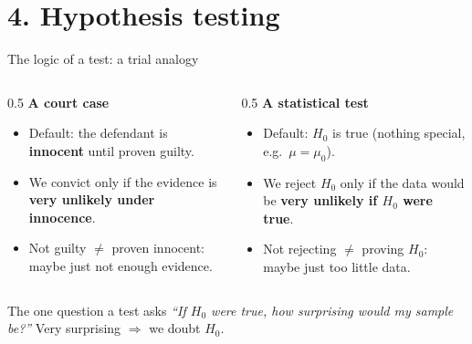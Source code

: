 \documentclass[
  11pt,
  ignorenonframetext,
  aspectratio=169,
]{beamer}
\providecommand{\tightlist}{%
  \setlength{\itemsep}{0pt}\setlength{\parskip}{0pt}}
\begin{document}
\section{4. Hypothesis testing}\label{hypothesis-testing}

\begin{frame}{The logic of a test: a trial analogy}
\protect{}\label{the-logic-of-a-test-a-trial-analogy}
\begin{columns}[T]
\begin{column}{0.5\linewidth}
\textbf{A court case}

\begin{itemize}
\tightlist
\item
  Default: the defendant is \textbf{innocent} until proven guilty.
\item
  We convict only if the evidence is \textbf{very unlikely under
  innocence}.
\item
  Not guilty \(\neq\) proven innocent: maybe just not enough evidence.
\end{itemize}
\end{column}

\begin{column}{0.5\linewidth}
\textbf{A statistical test}

\begin{itemize}
\tightlist
\item
  Default: \(H_0\) is true (nothing special, e.g.~\(\mu=\mu_0\)).
\item
  We reject \(H_0\) only if the data would be \textbf{very unlikely if
  \(H_0\) were true}.
\item
  Not rejecting \(\neq\) proving \(H_0\): maybe just too little data.
\end{itemize}
\end{column}
\end{columns}

\begin{block}{The one question a test asks}
\protect{}\label{the-one-question-a-test-asks}
\emph{``If \(H_0\) were true, how surprising would my sample be?''} Very
surprising \(\Rightarrow\) we doubt \(H_0\).
\end{block}
\end{frame}
\end{document}

